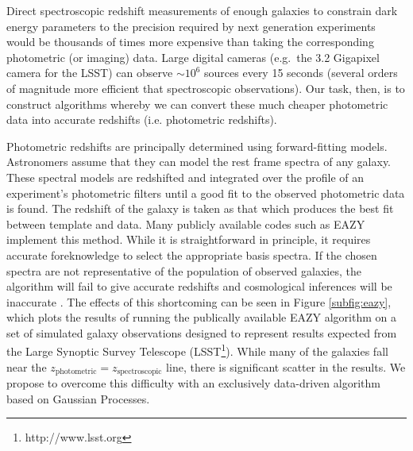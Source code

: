 \documentclass[useAMS,usenatbib,tightenlines,11pt,preprint]{aastex}
\begin{document}
Direct spectroscopic redshift measurements of enough galaxies to
constrain dark energy parameters to the precision required by next
generation experiments would be thousands of times more expensive than
taking the corresponding photometric (or imaging) data.  Large digital
cameras (e.g.\ the 3.2 Gigapixel camera for the LSST) can observe
$\sim 10^6$ sources every 15 seconds (several orders of magnitude more
efficient that spectroscopic observations). Our task, then, is to
construct algorithms whereby we can convert these much cheaper
photometric data into accurate redshifts (i.e. photometric redshifts).

Photometric redshifts are principally determined using
forward-fitting models.  Astronomers assume that they can model the rest frame
spectra of any galaxy.  These spectral models are
redshifted and integrated over the profile of an experiment's
photometric filters until a good fit to the observed photometric data is
found.  The redshift of the galaxy is taken as that which produces the best fit
between template and data.  Many publicly available codes such as 
EAZY \cite{eazy} implement this method.  
While it is straightforward in principle, it requires
accurate foreknowledge to select the appropriate basis spectra.  If the chosen
spectra are not representative of the population of observed
galaxies, the algorithm will fail to give accurate redshifts and cosmological
inferences will be inaccurate \cite{budavari2008}.  The effects of this
shortcoming can be seen in Figure \ref{subfig:eazy}, which plots the results
of running the publically available EAZY algorithm \cite{eazy} on a set of
simulated galaxy observations designed to represent results expected from the
Large Synoptic Survey Telescope (LSST\footnote{http://www.lsst.org}).
While many of the galaxies fall near the
$z_\text{photometric}=z_\text{spectroscopic}$ line, there is significant scatter
in the results.  We propose to overcome this difficulty with an exclusively
data-driven algorithm based on Gaussian Processes.
\end{document}
